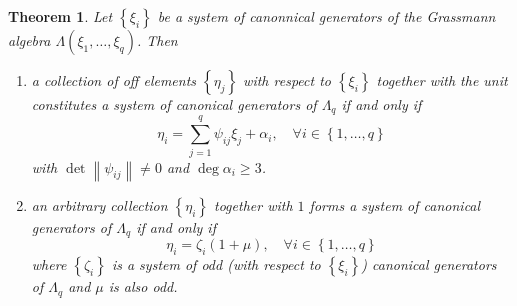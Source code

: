 \documentclass{article}
\newtheorem{theorem}{Theorem}
\theoremstyle{definition}
\begin{document}
\begin{theorem}
    \label{thm:grassmann_canonical_generators}
    Let $\left\{ \xi_i \right\}$ be a system of canonnical generators of the Grassmann algebra $\Lambda(\xi_1, \dots, \xi_q)$. Then
    \begin{enumerate}
        \item a collection of off elements $\left\{ \eta_j \right\}$ with respect to $\left\{ \xi_i \right\}$ together with the unit constitutes a system of canonical generators of $\Lambda_q$ if and only if
        \begin{equation*}
            \eta_i = \sum_{j = 1}^q \psi_{ij} \xi_j + \alpha_i, \quad \forall i \in \left\{ 1, \dots, q \right\}
        \end{equation*}
        with $\det \left\| \psi_{ij} \right\| \neq 0$ and $\deg \alpha_i \geq 3$.
        \item an arbitrary collection $\left\{ \eta_i \right\}$ together with $1$ forms a system of canonical generators of $\Lambda_q$ if and only if
        \begin{equation}
            \label{eq:canonical_generators}
            \eta_i = \zeta_i(1 + \mu), \quad \forall i \in \left\{ 1, \dots, q \right\}
        \end{equation}
        where $\left\{ \zeta_i \right\}$ is a system of odd (with respect to $\left\{ \xi_i \right\}$) canonical generators of $\Lambda_q$ and $\mu$ is also odd.
    \end{enumerate}
\end{theorem}
\end{document}
